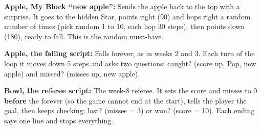 \documentclass[track=junior,level=2,teacher]{kidscode}
\newenvironment{refscript}[2]{\par\needspace{8\baselineskip}\noindent\textbf{\color{kcaccent}#1:} #2\par\smallskip\begin{center}\begin{scratch}[scale=0.8]}{\end{scratch}\end{center}}
\newenvironment{longrefscript}[2]{\par\clearpage\noindent\textbf{\color{kcaccent}#1:} #2\par\smallskip\begin{center}\begin{scratch}[scale=\longscale]}{\end{scratch}\end{center}}
\begin{document}
\begin{refscript}{Apple, My Block \enquote{new apple}}{Sends the apple back to the top with a surprise. It goes to the hidden Star, points right (90) and hops right a random number of times (pick random 1 to 10, each hop 30 steps), then points down (180), ready to fall. This is the random must-have.}
\end{refscript}

\begin{refscript}{Apple, the falling script}{Falls forever, as in weeks 2 and 3. Each turn of the loop it moves down 5 steps and asks two questions: caught? (score up, Pop, new apple) and missed? (misses up, new apple).}
\end{refscript}

\begin{longrefscript}{Bowl, the referee script}{The week-8 referee. It sets the score and misses to 0 \textbf{before} the forever (so the game cannot end at the start), tells the player the goal, then keeps checking: lost? (misses = 3) or won? (score = 10). Each ending says one line and stops everything.}
\end{longrefscript}
\end{document}
